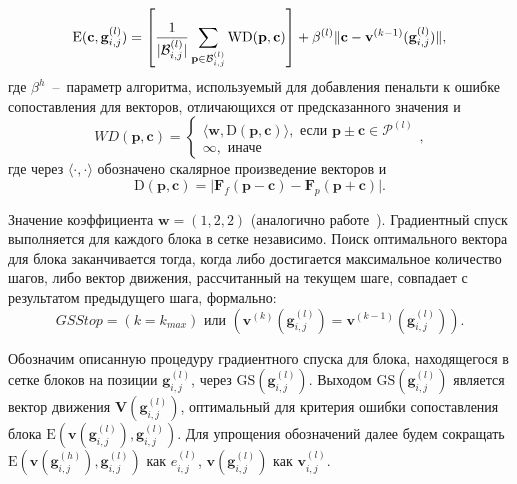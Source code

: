 \begin{equation*}
\mathrm{E}(\mathbf{c},\mathbf{g}_{i,j}^{(l)}) =
\left[\frac{1}{\vert \mathcal{B}_{i,j}^{(l)} \vert } \sum_{\mathbf{p} \in \mathcal{B}_{i,j}^{(l)}} \mathrm{WD}(\mathbf{p},\mathbf{c})\right] + \\
\beta^{(l)}\Vert\mathbf{c}-\mathbf{v}^{(k-1)}(\mathbf{g}_{i,j}^{(l)})\Vert,
\end{equation*}
где $\beta^{h}$~--~параметр алгоритма, используемый для добавления пенальти к ошибке сопоставления для векторов, отличающихся от предсказанного значения и
\begin{equation*}
WD(\mathbf{p},\mathbf{c}) = 
\begin{cases}
\langle \mathbf{w}, \mathrm{D}(\mathbf{p},\mathbf{c}) \rangle,\text{ если $\mathbf{p}\pm\mathbf{c} \in \mathcal{P}^{(l)}$} \\
\infty,\text{ иначе}
\end{cases},
\end{equation*}
где через $\langle\cdot,\cdot\rangle$ обозначено скалярное произведение векторов и 
\begin{equation*}
\mathrm{D}(\mathbf{p},\mathbf{c}) = \vert \mathbf{F}_f(\mathbf{p}-\mathbf{c}) - \mathbf{F}_p(\mathbf{p}+\mathbf{c}) \vert.
\end{equation*}

Значение коэффициента $\mathbf{w}=(1,2,2)$ (аналогично работе~\cite{5413657}).
Градиентный спуск выполняется для каждого блока в сетке независимо. Поиск оптимального вектора для блока заканчивается тогда, когда либо достигается максимальное количество шагов, либо вектор движения, рассчитанный на текущем шаге, совпадает с результатом предыдущего шага, формально:
\begin{equation*}
GSStop = (k = k_{max}) \text{ или } (\mathbf{v}^{(k)}(\mathbf{g}_{i,j}^{(l)}) = \mathbf{v}^{(k-1)}(\mathbf{g}_{i,j}^{(l)})).
\end{equation*}

Обозначим описанную процедуру градиентного спуска для блока, находящегося в сетке блоков на позиции $\mathbf{g}_{i,j}^{(l)}$, через $\mathrm{GS}(\mathbf{g}_{i,j}^{(l)})$. Выходом $\mathrm{GS}(\mathbf{g}_{i,j}^{(l)})$ является вектор движения $\mathbf{V}(\mathbf{g}_{i,j}^{(l)})$, оптимальный для критерия ошибки сопоставления блока $\mathrm{E}(\mathbf{v}(\mathbf{g}_{i,j}^{(l)}),\mathbf{g}_{i,j}^{(l)})$. Для упрощения обозначений далее будем сокращать $\mathrm{E}(\mathbf{v}(\mathbf{g}_{i,j}^{(h)}),\mathbf{g}_{i,j}^{(l)})$ как $e_{i,j}^{(l)}$, $\mathbf{v}(\mathbf{g}_{i,j}^{(l)})$ как $\mathbf{v}_{i,j}^{(l)}$.

